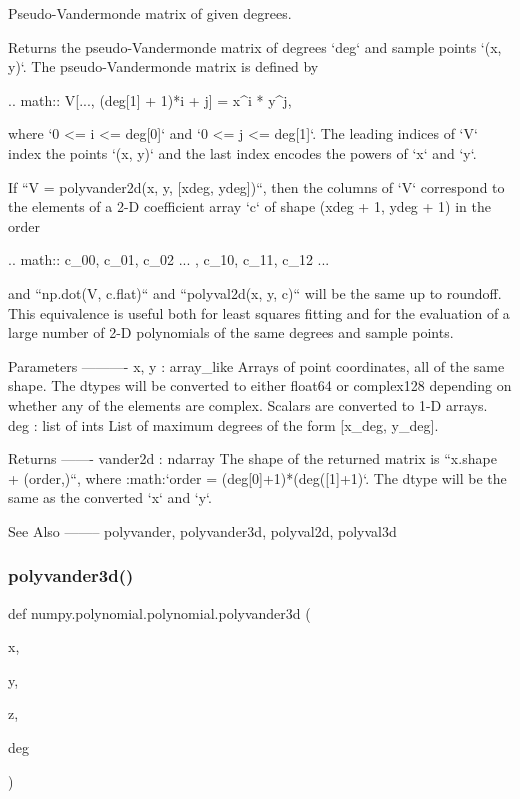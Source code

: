 \begin{DoxyVerb}Pseudo-Vandermonde matrix of given degrees.

Returns the pseudo-Vandermonde matrix of degrees `deg` and sample
points `(x, y)`. The pseudo-Vandermonde matrix is defined by

.. math:: V[..., (deg[1] + 1)*i + j] = x^i * y^j,

where `0 <= i <= deg[0]` and `0 <= j <= deg[1]`. The leading indices of
`V` index the points `(x, y)` and the last index encodes the powers of
`x` and `y`.

If ``V = polyvander2d(x, y, [xdeg, ydeg])``, then the columns of `V`
correspond to the elements of a 2-D coefficient array `c` of shape
(xdeg + 1, ydeg + 1) in the order

.. math:: c_{00}, c_{01}, c_{02} ... , c_{10}, c_{11}, c_{12} ...

and ``np.dot(V, c.flat)`` and ``polyval2d(x, y, c)`` will be the same
up to roundoff. This equivalence is useful both for least squares
fitting and for the evaluation of a large number of 2-D polynomials
of the same degrees and sample points.

Parameters
----------
x, y : array_like
    Arrays of point coordinates, all of the same shape. The dtypes
    will be converted to either float64 or complex128 depending on
    whether any of the elements are complex. Scalars are converted to
    1-D arrays.
deg : list of ints
    List of maximum degrees of the form [x_deg, y_deg].

Returns
-------
vander2d : ndarray
    The shape of the returned matrix is ``x.shape + (order,)``, where
    :math:`order = (deg[0]+1)*(deg([1]+1)`.  The dtype will be the same
    as the converted `x` and `y`.

See Also
--------
polyvander, polyvander3d, polyval2d, polyval3d\end{DoxyVerb}
 \mbox{\label{namespacenumpy_1_1polynomial_1_1polynomial_a08a1fb8064d263c7468215308fd6f0d9}} 
\subsubsection{\texorpdfstring{polyvander3d()}{polyvander3d()}}
{\footnotesize\ttfamily def numpy.\+polynomial.\+polynomial.\+polyvander3d (\begin{DoxyParamCaption}\item[{}]{x,  }\item[{}]{y,  }\item[{}]{z,  }\item[{}]{deg }\end{DoxyParamCaption})}

